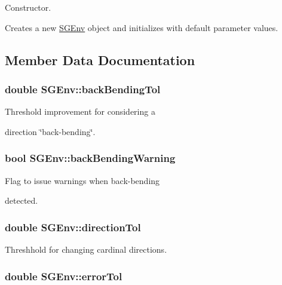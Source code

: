 Constructor. 

Creates a new \hyperlink{classSGEnv}{S\-G\-Env} object and initializes with default parameter values. 

\subsection{Member Data Documentation}
\hypertarget{classSGEnv_a5be9cb731e7dbe68eb18e08b28a28842}{
\subsubsection[{back\-Bending\-Tol}]{\setlength{\rightskip}{0pt plus 5cm}double S\-G\-Env\-::back\-Bending\-Tol\hspace{0.3cm}{\ttfamily [private]}}}\label{classSGEnv_a5be9cb731e7dbe68eb18e08b28a28842}
\begin{DoxyVerb}           Threshold improvement for considering a
\end{DoxyVerb}
 direction \char`\"{}back-\/bending\char`\"{}. \hypertarget{classSGEnv_a34be0dccccc949656a20f5355dcdac47}{
\subsubsection[{back\-Bending\-Warning}]{\setlength{\rightskip}{0pt plus 5cm}bool S\-G\-Env\-::back\-Bending\-Warning\hspace{0.3cm}{\ttfamily [private]}}}\label{classSGEnv_a34be0dccccc949656a20f5355dcdac47}
\begin{DoxyVerb}           Flag to issue warnings when back-bending
\end{DoxyVerb}
 detected. \hypertarget{classSGEnv_a1e3560dd1c3ba8a6c4186dfaa1c5af4e}{
\subsubsection[{direction\-Tol}]{\setlength{\rightskip}{0pt plus 5cm}double S\-G\-Env\-::direction\-Tol\hspace{0.3cm}{\ttfamily [private]}}}\label{classSGEnv_a1e3560dd1c3ba8a6c4186dfaa1c5af4e}
Threshhold for changing cardinal directions. \hypertarget{classSGEnv_a2b680d79a2bbb0e27b710bba29c6d407}{
\subsubsection[{error\-Tol}]{\setlength{\rightskip}{0pt plus 5cm}double S\-G\-Env\-::error\-Tol\hspace{0.3cm}{\ttfamily [private]}}}\label{classSGEnv_a2b680d79a2bbb0e27b710bba29c6d407}
